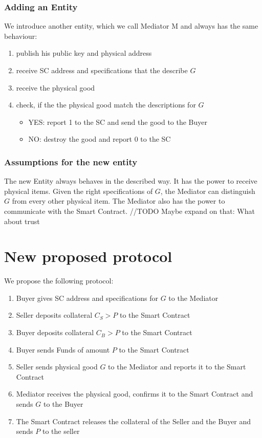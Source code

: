 \documentclass{cacthesis}
\begin{document}
\subsubsection{Adding an Entity}
We introduce another entity, which we call Mediator M and always has the same behaviour:
\begin{enumerate}
    \item publish his public key and physical address
    \item receive SC address and specifications that the describe $G$
    \item receive the physical good
    \item check, if the the physical good match the descriptions for $G$
    \begin{itemize}
        \item YES: report 1 to the SC and send the good to the Buyer
        \item NO: destroy the good and report 0 to the SC
    \end{itemize}
\end{enumerate}

\subsubsection{Assumptions for the new entity}
The new Entity always behaves in the described way. It has the power to receive physical items. Given the right specifications of $G$, the Mediator can distinguish $G$ from every other  physical item. The Mediator also has the power to communicate with the Smart Contract. 
//TODO Maybe expand on that: What about trust
\section{New proposed protocol}
We propose the following protocol:
\begin{enumerate}
    \item Buyer gives SC address and specifications for $G$ to the Mediator
    \item Seller deposits collateral $C_S > P$ to the Smart Contract
    \item Buyer deposits collateral $C_B > P$ to the Smart Contract
    \item Buyer sends Funds of amount $P$ to the Smart Contract
    \item Seller sends physical good $G$ to the Mediator and reports it to the Smart Contract
    \item Mediator receives the physical good, confirms it to the Smart Contract and sends $G$ to the Buyer
    \item The Smart Contract releases the collateral of the Seller and the Buyer and sends $P$ to the seller
\end{enumerate}
\end{document}
